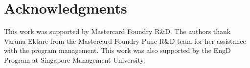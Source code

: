 \documentclass[sigconf]{aamas}
\begin{document}
\clearpage
\section{Acknowledgments}
This work was supported by Mastercard Foundry R\&D. The authors thank Varuna Ektare from the Mastercard Foundry Pune R\&D team for her assistance with the program management.
This work was also supported by the EngD Program at Singapore Management University.

 


\end{document}
